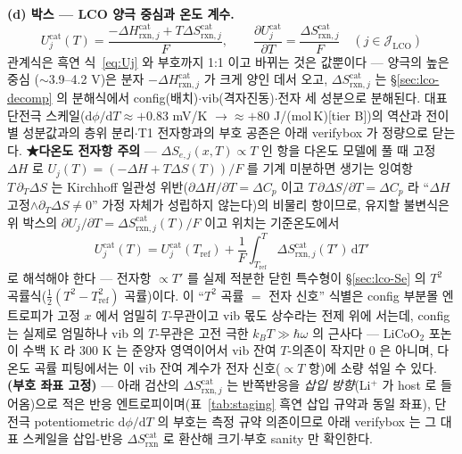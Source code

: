 \documentclass[11pt,a4paper]{article}
\newcommand{\dd}{\mathrm{d}}
\newcommand{\rxn}{\mathrm{rxn}}
\begin{document}
\textbf{(d) 박스 — LCO 양극 중심과 온도 계수.}
\begin{equation}
\boxed{\;
U_j^\mathrm{cat}(T)=\frac{-\Delta H_{\rxn,j}^\mathrm{cat}+T\Delta S_{\rxn,j}^\mathrm{cat}}{F},
\qquad
\frac{\partial U_j^\mathrm{cat}}{\partial T}=\frac{\Delta S_{\rxn,j}^\mathrm{cat}}{F}
\quad(j\in\mathcal J_\mathrm{LCO})\;}
\label{eq:lco-dUdT}
\end{equation}
관계식은 흑연 식~\eqref{eq:Uj} 와 부호까지 1:1 이고 바뀌는 것은 값뿐이다 — 양극의 높은 중심
($\sim$3.9--4.2 V)은 분자 $-\Delta H_{\rxn,j}^\mathrm{cat}$ 가 크게 양인 데서 오고, $\Delta S_{\rxn,j}^\mathrm{cat}$
는 \S\ref{sec:lco-decomp} 의 분해식에서 config(배치)$\cdot$vib(격자진동)$\cdot$전자 세 성분으로 분해된다.
대표 단전극 스케일($\dd\phi/\dd T\approx+0.83$ mV/K $\to\approx+80$ J/(mol\,K)[tier B])의 역산과
전이별 성분값과의 층위 분리$\cdot$T1 전자항과의 부호 공존은 아래 verifybox 가 정량으로 닫는다. \textbf{★다온도 전자항 주의} — $\Delta S_{e,j}(x,T)\propto T$
인 항을 다온도 모델에 풀 때 고정 $\Delta H$ 로 $U_j(T)=(-\Delta H+T\Delta S(T))/F$ 를 기계 미분하면 생기는
잉여항 $T\,\partial_T\Delta S$ 는 Kirchhoff 일관성 위반($\partial\Delta H/\partial T=\Delta C_p$ 이고
$T\,\partial\Delta S/\partial T=\Delta C_p$ 라 ``$\Delta H$ 고정$\wedge\partial_T\Delta S\ne0$'' 가정 자체가
성립하지 않는다)의 비물리 항이므로, 유지할 불변식은 위 박스의
$\partial U_j/\partial T=\Delta S_{\rxn,j}^\mathrm{cat}(T)/F$ 이고 위치는 기준온도에서
\[
U_j^\mathrm{cat}(T)=U_j^\mathrm{cat}(T_\mathrm{ref})+\frac1F\int_{T_\mathrm{ref}}^{T}\Delta S_{\rxn,j}^\mathrm{cat}(T')\,\dd T'
\]
로 해석해야 한다 — 전자항 $\propto T'$ 를 실제 적분한 닫힌 특수형이 \S\ref{sec:lco-Se} 의
$T^2$ 곡률식($\tfrac12(T^2-T_\mathrm{ref}^2)$ 곡률)이다. 이 ``$T^2$ 곡률 $=$ 전자 신호'' 식별은 config 부분몰 엔트로피가
고정 $x$ 에서 엄밀히 $T$-무관이고 vib 몫도 상수라는 전제 위에 서는데, config 는 실제로 엄밀하나 vib 의 $T$-무관은
고전 극한 $k_BT\gg\hbar\omega$ 의 근사다 --- $\mathrm{LiCoO_2}$ 포논이 수백 K 라 $300$ K 는 준양자 영역이어서 vib 잔여
$T$-의존이 작지만 $0$ 은 아니며, 다온도 곡률 피팅에서는 이 vib 잔여 계수가 전자 신호($\propto T$ 항)에 소량 섞일 수 있다.
\textbf{(부호 좌표 고정)} — 아래 검산의 $\Delta S_{\rxn,j}^\mathrm{cat}$ 는 반쪽반응을
\emph{삽입 방향}(Li$^+$ 가 host 로 들어옴)으로 적은 반응 엔트로피이며(표~\ref{tab:staging} 흑연 삽입 규약과
동일 좌표), 단전극 potentiometric $\dd\phi/\dd T$ 의 부호는 측정 규약 의존이므로 아래 verifybox 는 그
대표 스케일을 삽입-반응 $\Delta S_{\rxn}^\mathrm{cat}$ 로 환산해 크기$\cdot$부호 sanity 만 확인한다.
\end{document}
